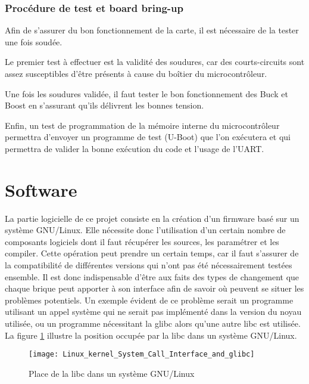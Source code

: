 \begin{itemize}
\end{itemize}

\subsubsection{Procédure de test et board bring-up}       
	Afin de s'assurer du bon fonctionnement de la carte, il est nécessaire de la tester une fois soudée.
    
    Le premier test à effectuer est la validité des soudures, car des courts-circuits sont assez susceptibles d'être présents à cause du boîtier du microcontrôleur.

	Une fois les soudures validée, il faut tester le bon fonctionnement des Buck et Boost en s'assurant qu'ils délivrent les bonnes tension.
    
    Enfin, un test de programmation de la mémoire interne du microcontrôleur permettra d'envoyer un programme de test (U-Boot) que l'on exécutera et qui permettra de valider la bonne exécution du code et l'usage de l'UART.

\section{Software}
La partie logicielle de ce projet consiste en la création d'un firmware basé sur un système GNU/Linux.
Elle nécessite donc l'utilisation d'un certain nombre de composants logiciels dont il faut récupérer les sources, les paramétrer et les compiler.
Cette opération peut prendre un certain temps, car il faut s'assurer de la compatibilité de différentes versions qui n'ont pas été nécessairement testées ensemble.
Il est donc indispensable d'être aux faits des types de changement que chaque brique peut apporter à son interface afin de savoir où peuvent se situer les problèmes potentiels.
Un exemple évident de ce problème serait un programme utilisant un appel système qui ne serait pas implémenté dans la version du noyau utilisée, ou un programme nécessitant la glibc alors qu'une autre libc est utilisée.
La figure \ref{libc} illustre la position occupée par la libc dans un système GNU/Linux.
\begin{figure}[H]
	\begin{center}
		\texttt{[image: Linux\_kernel\_System\_Call\_Interface\_and\_glibc]}
	\end{center}
	\caption{Place de la libc dans un système GNU/Linux}
	\label{libc}
\end{figure}
    

